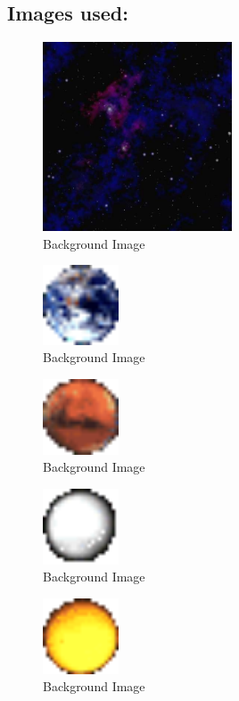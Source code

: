 \subsection{Images used:}\label{sec:ps3a:img}
\begin{figure}[h]
    \centering
    \includegraphics[width=0.5\textwidth]{ps3a/starfield.jpg}
    \caption{Background Image}
    \label{fig:ps3abg}
\end{figure}
\begin{figure}[h]
    \centering
    \includegraphics[width=0.2\textwidth]{ps3a/earth.png}
    \caption{Background Image}
    \label{fig:earth}
\end{figure}
\begin{figure}[h]
    \centering
    \includegraphics[width=0.2\textwidth]{ps3a/mars.png}
    \caption{Background Image}
    \label{fig:mars}
\end{figure}
\newpage
\begin{figure}[h]
    \centering
    \includegraphics[width=0.2\textwidth]{ps3a/venus.png}
    \caption{Background Image}
    \label{fig:venus}
\end{figure}\begin{figure}[h]
    \centering
    \includegraphics[width=0.2\textwidth]{ps3a/sun.png}
    \caption{Background Image}
    \label{fig:sun}
\end{figure}
